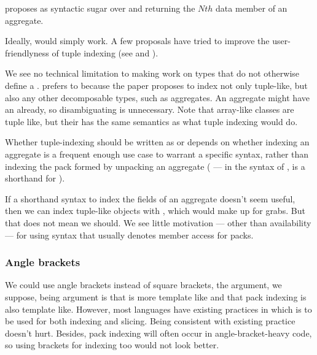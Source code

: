 \documentclass{wg21}
\begin{document}
 proposes  as syntactic sugar over
and  returning the $Nth$ data member of an aggregate. %

Ideally,  would simply work.
A few proposals have tried to improve the user-friendlyness
of tuple indexing (see
 and ).

We see no technical limitation to making  work on types that do not otherwise define a .
 prefers  to \tcode{[]} because the paper proposes to index not only tuple-like, but also any other decomposable types, such as aggregates.
An aggregate might have an  already, so disambiguating is unnecessary.
Note that array-like classes are tuple like, but their  has the same semantics as what tuple indexing would do. %

Whether tuple-indexing should be written as  or \tcode{[]} depends on whether indexing an aggregate is a frequent enough use case
to warrant a specific syntax, rather than indexing the pack formed by unpacking an aggregate ( --- in the syntax of ,  is a shorthand for ).

If %
a shorthand syntax to index the fields of an aggregate doesn't seem useful, then we can index tuple-like objects with , which would make
 up for grabs. But that does not mean we should. We see little motivation --- other than availability --- for using syntax that usually denotes member access for packs.

\subsubsection{Angle brackets}

We could use angle brackets instead of square brackets, the argument, we suppose, being argument is that \tcode{<>} is more template like and that pack indexing is also template like.
However, most languages have existing practices in which \tcode{[]} is to be used for both indexing and slicing.
Being consistent with existing practice doesn't hurt.
Besides, pack indexing will often occur in angle-bracket-heavy code, so using brackets for indexing too would not look better.
\end{document}
